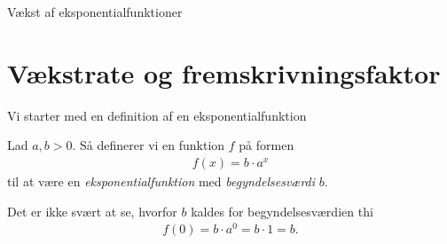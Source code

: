 
\begin{center}
\Huge
Vækst af eksponentialfunktioner
\end{center}
\section*{Vækstrate og fremskrivningsfaktor}

Vi starter med en definition af en eksponentialfunktion
\begin{defn}[Eksponentialfunktion]
	Lad $a,b>0$. Så definerer vi en funktion $f$ på formen 
	\begin{align*}
		f(x) = b\cdot a^x
	\end{align*}
	til at være en \textit{eksponentialfunktion} med \textit{begyndelsesværdi} $b$. 
\end{defn}

Det er ikke svært at se, hvorfor $b$ kaldes for begyndelsesværdien thi
\begin{align*}
	f(0) = b\cdot a^0 = b\cdot 1 = b.
\end{align*}

